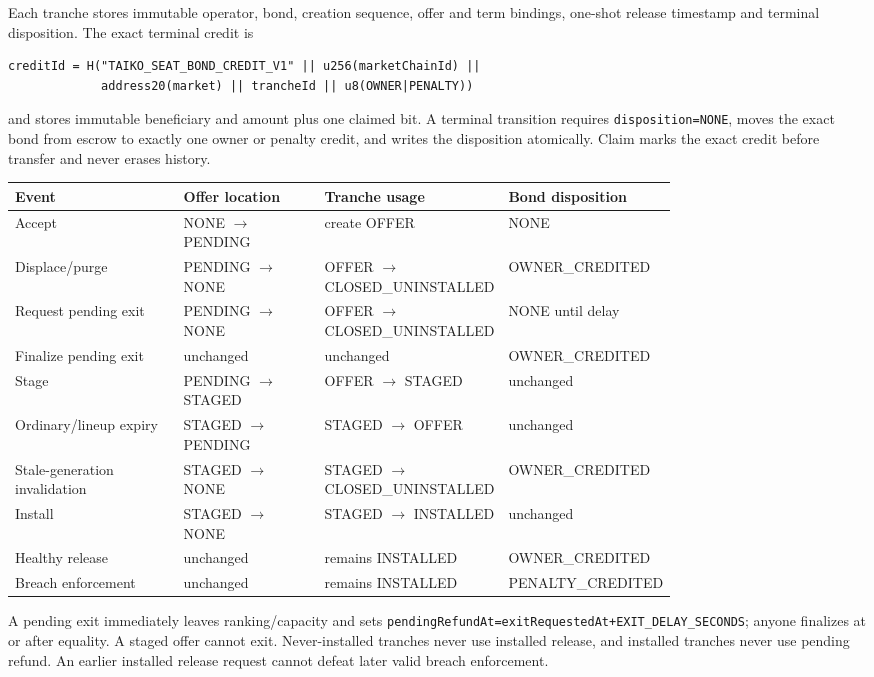 \documentclass[a4paper,11pt]{article}
\newcommand{\code}[1]{\nolinkurl{#1}}
\begin{document}
Each tranche stores immutable operator, bond, creation sequence, offer and term
bindings, one-shot release timestamp and terminal disposition.  The exact
terminal credit is
\begin{verbatim}
creditId = H("TAIKO_SEAT_BOND_CREDIT_V1" || u256(marketChainId) ||
             address20(market) || trancheId || u8(OWNER|PENALTY))
\end{verbatim}
and stores immutable beneficiary and amount plus one claimed bit.  A terminal
transition requires \code{disposition=NONE}, moves the exact bond from escrow to
exactly one owner or penalty credit, and writes the disposition atomically.
Claim marks the exact credit before transfer and never erases history.

\begin{xltabular}{\linewidth}{p{0.27\linewidth}p{0.23\linewidth}p{0.27\linewidth}X}
\toprule
\textbf{Event} & \textbf{Offer location} & \textbf{Tranche usage} & \textbf{Bond disposition} \\
\midrule
Accept & NONE $\to$ PENDING & create OFFER & NONE \\
Displace/purge & PENDING $\to$ NONE & OFFER $\to$ CLOSED\_UNINSTALLED & OWNER\_CREDITED \\
Request pending exit & PENDING $\to$ NONE & OFFER $\to$ CLOSED\_UNINSTALLED & NONE until delay \\
Finalize pending exit & unchanged & unchanged & OWNER\_CREDITED \\
Stage & PENDING $\to$ STAGED & OFFER $\to$ STAGED & unchanged \\
Ordinary/lineup expiry & STAGED $\to$ PENDING & STAGED $\to$ OFFER & unchanged \\
Stale-generation invalidation & STAGED $\to$ NONE & STAGED $\to$ CLOSED\_UNINSTALLED & OWNER\_CREDITED \\
Install & STAGED $\to$ NONE & STAGED $\to$ INSTALLED & unchanged \\
Healthy release & unchanged & remains INSTALLED & OWNER\_CREDITED \\
Breach enforcement & unchanged & remains INSTALLED & PENALTY\_CREDITED \\
\bottomrule
\end{xltabular}

A pending exit immediately leaves ranking/capacity and sets
\code{pendingRefundAt=exitRequestedAt+EXIT_DELAY_SECONDS}; anyone finalizes at or
after equality.  A staged offer cannot exit.  Never-installed tranches never use
installed release, and installed tranches never use pending refund.  An earlier
installed release request cannot defeat later valid breach enforcement.
\end{document}
